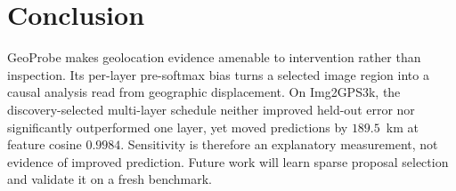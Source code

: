 \section{Conclusion}

GeoProbe makes geolocation evidence amenable to intervention rather than
inspection. Its per-layer pre-softmax bias turns a selected image region into a
causal analysis read from geographic displacement. On Img2GPS3k, the
discovery-selected multi-layer schedule neither improved held-out error nor
significantly outperformed one layer, yet moved predictions by $189.5$~km at
feature cosine $0.9984$. Sensitivity is therefore an explanatory measurement,
not evidence of improved prediction. Future work will learn sparse proposal
selection and validate it on a fresh benchmark.
